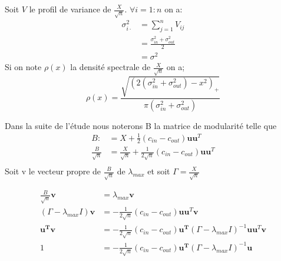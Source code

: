 Soit $V$ le profil de variance de $\frac{X}{\sqrt{n}}$. $\forall i = 1:n$ on a: 
\begin{align*} 
\sigma_{i \cdot}^2 &= \sum_{j=1}^{n}V_{ij}  \\
 		&= \frac{\sigma_{in}^2 + \sigma_{out}^2}{2}  \\
		&=\sigma^2
\end{align*}
Si on note $\rho(x)$ la densité spectrale de $\frac{X}{\sqrt{n}}$ on a;
\begin{equation}
	\rho(x) = \frac{\sqrt{(2(\sigma_{in}^2 + \sigma_{out}^2) - x^2)_+}}{\pi(\sigma_{in}^2 + \sigma_{out}^2)}
\end{equation}

Dans la suite de l'étude nous noterons B la matrice de modularité telle que 
\begin{align*} 
B :&= X + \frac{1}{2}(c_{in} - c_{out})\mathbf{uu}^T \\
\frac{B}{\sqrt{n}} &= \frac{X}{\sqrt{n}} + \frac{1}{2\sqrt{n}}(c_{in} - c_{out})\mathbf{uu}^T\\
\end{align*}
Soit v le vecteur propre de $\frac{B}{\sqrt{n}}$ de $\lambda_{max}$ et soit $\Gamma = \frac{X}{\sqrt{n}}$

\begin{align} 
\frac{B}{\sqrt{n}}\mathbf{v} &= \lambda_{max}\mathbf{v} \nonumber\\
(\Gamma - \lambda_{max}I)\mathbf{v} &= -\frac{1}{2\sqrt{n}}(c_{in} - c_{out})\mathbf{uu}^T \mathbf{v} \nonumber\\
 \mathbf{u^Tv} &= -\frac{1}{2\sqrt{n}}(c_{in} - c_{out})\mathbf{u^T}(\Gamma - \lambda_{max}I)^{-1}\mathbf{uu}^T \mathbf{v} \nonumber\\
 1 &= -\frac{1}{2\sqrt{n}}(c_{in} - c_{out})\mathbf{u^T}(\Gamma - \lambda_{max}I)^{-1}\mathbf{u} \label{eq:3}
\end{align}

